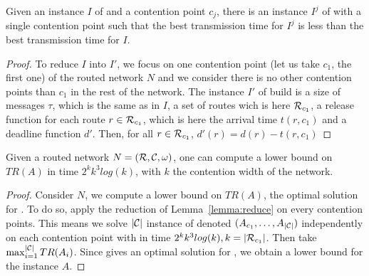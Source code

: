 \begin{lemma}\label{lemma:reduce}
Given an instance $I$ of \spall and a contention point $c_j$, there is an instance $I^j$ of 
 \spall with a single contention point such that the best transmission time for $I^j$ is less than 
 the best transmission time for $I$. 
\end{lemma}
\begin{proof}
To reduce $I$ into $I'$, we focus on one contention point (let us take $c_1$, the first one) of the routed network $N$ and we consider there is no other contention points than $c_1$ in the rest of the network. The instance $I'$ of \wta build is a size of messages $\tau$, which is the same as in $I$, a set of routes wich is here ${\cal R}_{c_1}$, a release function for each route $r \in {\cal R}_{c_1}$, which is here the arrival time $t(r,c_1)$ and a deadline function $d'$. 
 Then, for all $r \in {\cal R}_{c_1}$, $d'(r) = d(r) - t(r,c_1) $
\end{proof}



\begin{corollary}\label{th:lowerbound}
Given a routed network $N = ({\cal R},{\cal C},\omega)$, one can compute a lower bound on $TR(A)$ in time $2^kk^3log(k)$, with $k$ the contention width of the network.
\end{corollary}
\begin{proof}
Consider $N$, we compute a lower bound on $TR(A)$, the optimal solution for \spall. To do so, apply the reduction of Lemma~\ref{lemma:reduce} on every contention points. This means we solve $|{\cal C}|$ instance of \wta denoted $(A_{c_1},\ldots,A_{|{\cal C}|})$ independently on each contention point with \ASPMLS in time $2^kk^3log(k), k = |{\cal R}_{c_1}|$. Then take $\max_{i=1}^{|{\cal C}|} TR(A_i)$. Since \ASPMLS gives an optimal solution for \wta, we obtain a lower bound for the instance $A$.
\end{proof}


